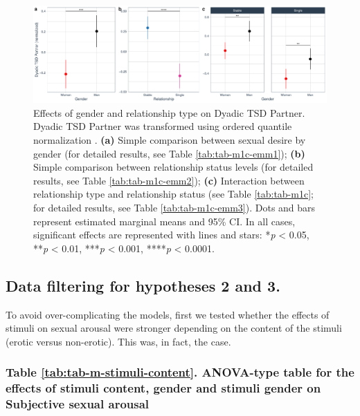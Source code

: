 \documentclass[
  bookmarksnumbered]{article}
\begin{document}
\begin{figure}
\centering
\includegraphics{Sexual_Desire_Arousal_files/figure-latex/fig-h1c-1.pdf}
\caption{\label{fig:fig-h1c}Effects of gender and relationship type on Dyadic TSD Partner. Dyadic TSD Partner was transformed using ordered quantile normalization \autocite{petersonOrderedQuantileNormalization2020a}. \textbf{(a)} Simple comparison between sexual desire by gender (for detailed results, see Table \ref{tab:tab-m1c-emm1}); \textbf{(b)} Simple comparison between relationship status levels (for detailed results, see Table \ref{tab:tab-m1c-emm2}); \textbf{(c)} Interaction between relationship type and relationship status (see Table \ref{tab:tab-m1c}; for detailed results, see Table \ref{tab:tab-m1c-emm3}). Dots and bars represent estimated marginal means and 95\% CI. In all cases, significant effects are represented with lines and stars: *\emph{p} \textless{} 0.05, **\emph{p} \textless{} 0.01, ***\emph{p} \textless{} 0.001, ****\emph{p} \textless{} 0.0001.}
\end{figure}

\subsection{Data filtering for hypotheses 2 and 3.}\label{datfil2and3}

To avoid over-complicating the models, first we tested whether the effects of stimuli on sexual arousal were stronger depending on the content of the stimuli (erotic versus non-erotic). This was, in fact, the case.

\subsubsection{Table \ref{tab:tab-m-stimuli-content}. ANOVA-type table for the effects of stimuli content, gender and stimuli gender on Subjective sexual arousal}\label{table-reftabtab-m-stimuli-content.-anova-type-table-for-the-effects-of-stimuli-content-gender-and-stimuli-gender-on-subjective-sexual-arousal}
\end{document}
